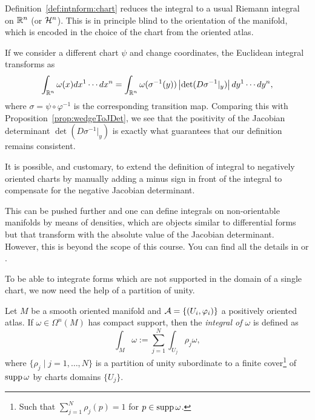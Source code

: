 \begin{remark}
	Definition~\ref{def:intnform:chart} reduces the integral to a usual Riemann integral on $\mathbb{R}^n$ (or $\mathcal{H}^n$). This is in principle blind to the orientation of the manifold, which is encoded in the choice of the chart from the oriented atlas.

	If we consider a different chart $\psi$ and change coordinates, the Euclidean integral transforms as
	\begin{align}
		\int_{\mathbb{R}^n} \omega(x) d x^1\cdots dx^n  = \int_{\mathbb{R}^n} \omega(\sigma^{-1}(y)) \left|\det(D\sigma^{-1}|_y)\right| d y^1\cdots dy^n,
	\end{align}
	where $\sigma = \psi\circ\varphi^{-1}$ is the corresponding transition map.
	Comparing this with Proposition~\ref{prop:wedgeToJDet}, we see that the positivity of the Jacobian determinant $\det(D\sigma^{-1}|_y)$ is exactly what guarantees that our definition remains consistent.

	It is possible, and customary, to extend the definition of integral to negatively oriented charts by manually adding a minus sign in front of the integral to compensate for the negative Jacobian determinant.

	This can be pushed further and one can define integrals on non-orientable manifolds by means of densities, which are objects similar to differential forms but that transform with the absolute value of the Jacobian determinant.
	However, this is beyond the scope of this course. You can find all the details in \cite[Chapter 16]{book:lee} or \cite[Chapters 6 and 7]{book:abrahammarsdenratiu}.
\end{remark}

To be able to integrate forms which are not supported in the domain of a single chart, we now need the help of a partition of unity.

\begin{definition}
	Let $M$ be a smooth oriented manifold and $\mathcal{A} = \{(U_i,\varphi_i)\}$ a positively oriented atlas.
	If $\omega \in \Omega^n(M)$ has compact support, then the \emph{integral of $\omega$} is defined as
	\begin{equation}\label{eq:intnform}
		\int_M \omega := \sum_{j=1}^N \int_{U_j}\rho_j\omega,
	\end{equation}
	where $\{\rho_j\mid j=1,\ldots, N\}$ is a partition of unity subordinate to a finite cover\footnote{Such that $\sum_{j=1}^N \rho_j(p) = 1$ for $p\in\operatorname{supp}\omega$.} of $\operatorname{supp} \omega$ by charts domains $\{U_j\}$.
\end{definition}

